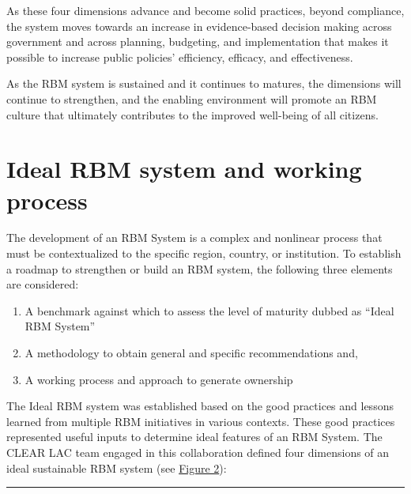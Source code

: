 \documentclass[
  10pt,
]{book}
\providecommand{\tightlist}{%
  \setlength{\itemsep}{0pt}\setlength{\parskip}{0pt}}
\begin{document}
As these four dimensions advance and become solid practices, beyond compliance, the system moves towards an increase in evidence-based decision making across government and across planning, budgeting, and implementation that makes it possible to increase public policies' efficiency, efficacy, and effectiveness.

As the RBM system is sustained and it continues to matures, the dimensions will continue to strengthen, and the enabling environment will promote an RBM culture that ultimately contributes to the improved well-being of all citizens.

\hypertarget{ideal-rbm-system-and-working-process}{%
\section{Ideal RBM system and working process}\label{ideal-rbm-system-and-working-process}}

The development of an RBM System is a complex and nonlinear process that must be contextualized to the specific region, country, or institution. To establish a roadmap to strengthen or build an RBM system, the following three elements are considered:

\begin{enumerate}
\def\labelenumi{\arabic{enumi}.}
\tightlist
\item
  A benchmark against which to assess the level of maturity dubbed as ``Ideal RBM System''
\item
  A methodology to obtain general and specific recommendations and,
\item
  A working process and approach to generate ownership
\end{enumerate}

The Ideal RBM system was established based on the good practices and lessons learned from multiple RBM initiatives in various contexts. These good practices represented useful inputs to determine ideal features of an RBM System. The CLEAR LAC team engaged in this collaboration defined four dimensions of an ideal sustainable RBM system (see \protect\hyperlink{fig:figure2}{Figure 2}):

\begin{center}\rule{0.5\linewidth}{0.5pt}\end{center}
\end{document}
